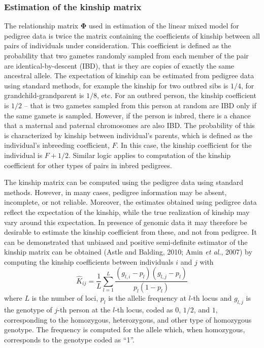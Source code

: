 \documentclass[12pt,a4paper]{article}
\begin{document}
\subsubsection{Estimation of the kinship matrix}
\label{kinship}

The relationship matrix $\mathbf{\Phi}$ used in estimation of the 
linear mixed model for pedigree data is twice the matrix containing 
the coefficients of kinship between all pairs of individuals under consideration. 
This coefficient is defined as the probability that two gametes randomly sampled 
from each member of the pair are identical-by-descent (IBD), that is they are copies 
of exactly the same ancestral allele. The expectation of kinship 
can be estimated from pedigree data using standard methods, for example the 
kinship for two outbred sibs is $1/4$, for grandchild-grandparent is $1/8$, etc.
For an outbred person, the kinship coefficient is $1/2$ -- that is two gametes 
sampled from this person at random are IBD only if the same gamete is 
sampled. However, if the person is inbred, there is a chance that a maternal 
and paternal chromosomes are also IBD. The probability of this is characterized 
by kinship between individual's parents, which is defined as the individual's
inbreeding coefficient, $F$. In this case, the kinship coefficient for the 
individual is $F + 1/2$. Similar logic applies to computation of the kinship 
coefficient for other types of pairs in inbred pedigrees. 

The kinship matrix can be computed using the pedigree data using standard methods.
However, in many cases, pedigree information may be absent, incomplete, or not 
reliable. Moreover, the estimates obtained using pedigree data reflect the 
expectation of the kinship, while the true realization of kinship may vary 
around this expectation. In presence of genomic data it may therefore be 
desirable to estimate the kinship coefficient from these, and not from pedigree. 
It can be demonstrated that unbiased and positive semi-definite estimator 
of the kinship matrix can be obtained (Astle and Balding, 2010; Amin \emph{et al.}, 2007)
by computing the kinship coefficients between individuals $i$ and $j$ with
$$
\hat{K}_{ij} = \frac{1}{L} \sum_{l=1}^L \frac{ (g_{l,i} - p_l) (g_{l,j} - p_l) }{ p_l (1-p_l) }
$$
where $L$ is the number of loci, $p_l$ is the allelic frequency at $l$-th locus
and $g_{l,j}$ is the genotype of $j$-th person at the $l$-th locus, coded 
as $0$, $1/2$, and $1$, corresponding to the homozygous, heterozygous, and 
other type of homozygous genotype. The frequency is computed for the allele 
which, when homozygous, corresponds to the genotype coded as ``1''.
\end{document}
